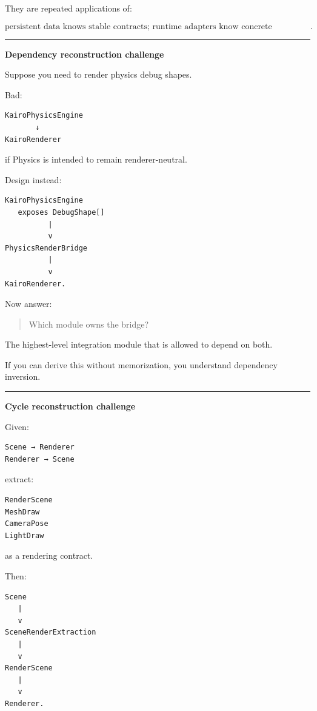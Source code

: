 They are repeated applications of:

\[
\boxed{
\text{persistent data knows stable contracts;
runtime adapters know concrete implementations}.
}
\]

\begin{center}\rule{0.5\linewidth}{0.5pt}\end{center}

\textbf{Dependency reconstruction challenge}

Suppose you need to render physics debug shapes.

Bad:

\begin{verbatim}
KairoPhysicsEngine
       ↓
KairoRenderer
\end{verbatim}

if Physics is intended to remain renderer-neutral.

Design instead:

\begin{verbatim}
KairoPhysicsEngine
   exposes DebugShape[]
          |
          v
PhysicsRenderBridge
          |
          v
KairoRenderer.
\end{verbatim}

Now answer:

\begin{quote}
Which module owns the bridge?
\end{quote}

The highest-level integration module that is allowed to depend on both.

If you can derive this without memorization, you understand dependency inversion.

\begin{center}\rule{0.5\linewidth}{0.5pt}\end{center}

\textbf{Cycle reconstruction challenge}

Given:

\begin{verbatim}
Scene → Renderer
Renderer → Scene
\end{verbatim}

extract:

\begin{verbatim}
RenderScene
MeshDraw
CameraPose
LightDraw
\end{verbatim}

as a rendering contract.

Then:

\begin{verbatim}
Scene
   |
   v
SceneRenderExtraction
   |
   v
RenderScene
   |
   v
Renderer.
\end{verbatim}

